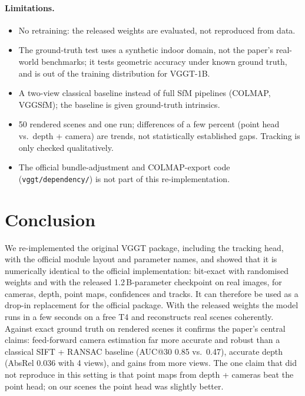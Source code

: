 \documentclass[11pt,a4paper]{article}
\begin{document}
\paragraph{Limitations.}
\begin{itemize}[leftmargin=*,itemsep=1pt]
  \item No retraining: the released weights are evaluated, not reproduced from data.
  \item The ground-truth test uses a synthetic indoor domain, not the paper's real-world benchmarks; it tests geometric accuracy
        under known ground truth, and is out of the training distribution for VGGT-1B.
  \item A two-view classical baseline instead of full SfM pipelines (COLMAP, VGGSfM); the baseline is given ground-truth intrinsics.
  \item 50 rendered scenes and one run; differences of a few percent (point head vs.\ depth + camera) are trends, not
        statistically established gaps. Tracking is only checked qualitatively.
  \item The official bundle-adjustment and COLMAP-export code (\texttt{vggt/dependency/}) is not part of this re-implementation.
\end{itemize}

\section{Conclusion}

We re-implemented the original VGGT package, including the tracking head, with the official module layout and parameter
names, and showed that it is numerically identical to the official implementation: bit-exact with randomised weights and
with the released 1.2\,B-parameter checkpoint on real images, for cameras, depth, point maps, confidences and tracks. It can
therefore be used as a drop-in replacement for the official package. With the released weights the model runs in a few
seconds on a free T4 and reconstructs real scenes coherently. Against exact ground truth on rendered scenes it confirms the
paper's central claims: feed-forward camera estimation far more accurate and robust than a classical SIFT + RANSAC baseline
(AUC@30 0.85 vs.\ 0.47), accurate depth (AbsRel 0.036 with 4 views), and gains from more views. The one claim that did not
reproduce in this setting is that point maps from depth + cameras beat the point head; on our scenes the point head was
slightly better.
\end{document}
